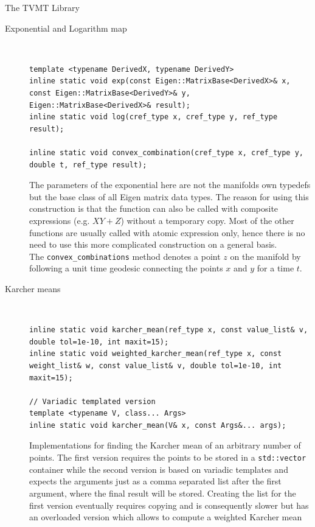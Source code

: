 \begin{chapter}{The TVMT Library}
\begin{description}
    \item[Exponential and Logarithm map] \hfill \\
	\cppinline
	\begin{lstlisting}
template <typename DerivedX, typename DerivedY>
inline static void exp(const Eigen::MatrixBase<DerivedX>& x, const Eigen::MatrixBase<DerivedY>& y, Eigen::MatrixBase<DerivedX>& result);
inline static void log(cref_type x, cref_type y, ref_type result);

inline static void convex_combination(cref_type x, cref_type y, double t, ref_type result);
	\end{lstlisting}

	The parameters of the exponential here are not the manifolds own typedefs but the base class of all Eigen matrix data types. The reason for using this construction is that the function
	can also be called with composite expressions (e.g. $XY+Z$) without a temporary copy. Most of the other functions are usually called with atomic expression only, hence there is no
	need to use this more complicated construction on a general basis.\\
	The \texttt{convex\_combinations} method denotes a point $z$ on the manifold by following a unit time geodesic connecting the points $x$ and $y$ for a time $t$.

    \item[Karcher means] \hfill \\
	\cppinline
	\begin{lstlisting}
inline static void karcher_mean(ref_type x, const value_list& v, double tol=1e-10, int maxit=15);
inline static void weighted_karcher_mean(ref_type x, const weight_list& w, const value_list& v, double tol=1e-10, int maxit=15);

// Variadic templated version
template <typename V, class... Args>
inline static void karcher_mean(V& x, const Args&... args);
	\end{lstlisting}
	
	Implementations for finding the Karcher mean of an arbitrary number of points. The first version requires the points to be stored in a \texttt{std::vector} container while
	the second version is based on variadic templates and expects the arguments just as a comma separated list after the first argument, where the final result will be stored.
	Creating the list for the first version eventually requires copying and is consequently slower but has an overloaded version which allows to compute a weighted Karcher mean
    

\end{description}
\end{chapter}
